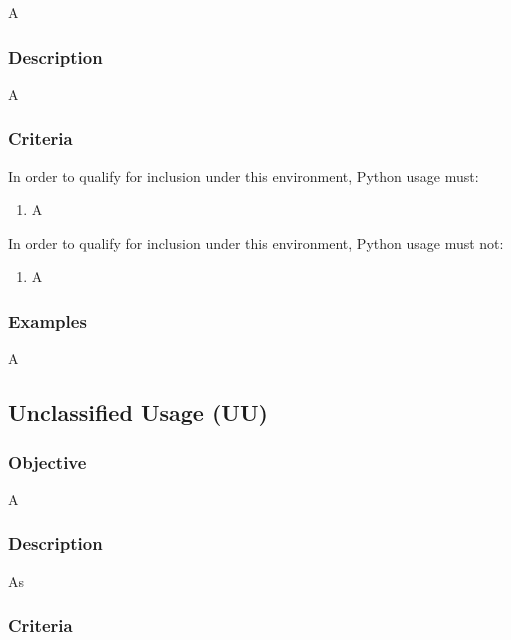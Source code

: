			A

		\subsubsection{Description}

			A

		\subsubsection{Criteria}

			In order to qualify for inclusion under this environment, Python usage must:

			\begin{enumerate}
        		\item A
        	\end{enumerate}

			In order to qualify for inclusion under this environment, Python usage must not:

			\begin{enumerate}
        		\item A
        	\end{enumerate}

		\subsubsection{Examples}

			A


	\subsection{Unclassified Usage (UU)}

		\subsubsection{Objective}

			A

		\subsubsection{Description}

			As

		\subsubsection{Criteria}

